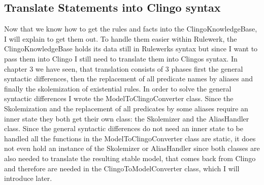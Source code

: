 \documentclass[hyperref, bachelorofscience]{cgvpub}
\begin{document}
\subsection{Translate Statements into Clingo syntax}
Now that we know how to get the rules and facts into the ClingoKnowledgeBase, I will explain to get them out. To handle them easier within Rulewerk, the ClingoKnowledgeBase holds its data still in Rulewerks syntax but since I want to pass them into Clingo I still need to translate them into Clingos syntax. In chapter 3 we have seen, that translation consists of 3 phases first the general syntactic differences, then the replacement of all predicate names by aliases and finally the skolemization of existential rules. In order to solve the general syntactic differences I wrote the ModelToClingoConverter class. Since the Skolemization and the replacement of all predicates by some aliases require an inner state they both get their own class: the Skolemizer and the AliasHandler class. Since the general syntactic differences do not need an inner state to be handled all the functions in the ModelToClingoConverter class are static, it does not even hold an instance of the Skolemizer or AliasHandler since both classes are also needed to translate the resulting stable model, that comes back from Clingo and therefore are needed in the ClingoToModelConverter class, which I will introduce later.\\
\end{document}

